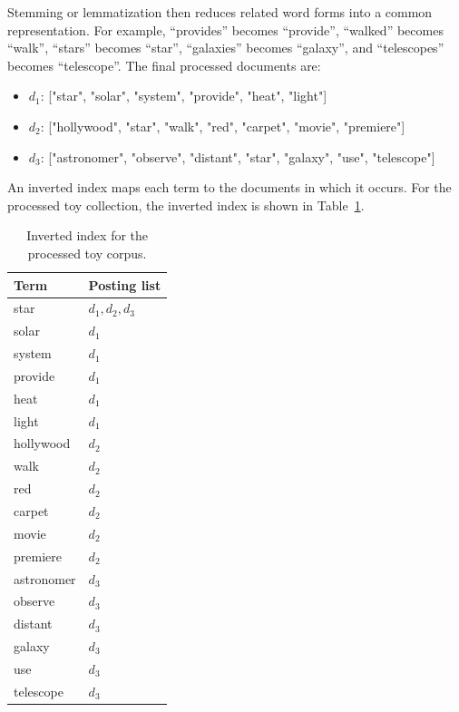Stemming or lemmatization then reduces related word forms into a common
representation. For example, ``provides'' becomes ``provide'', ``walked''
becomes ``walk'', ``stars'' becomes ``star'', ``galaxies'' becomes
``galaxy'', and ``telescopes'' becomes ``telescope''. The final processed
documents are:

\begin{itemize}
    \item $d_1$: ["star", "solar", "system", "provide", "heat", "light"]
    \item $d_2$: ["hollywood", "star", "walk", "red", "carpet", "movie", "premiere"]
    \item $d_3$: ["astronomer", "observe", "distant", "star", "galaxy", "use", "telescope"]
\end{itemize}

An inverted index maps each term to the documents in which it occurs. For the
processed toy collection, the inverted index is shown in
Table~\ref{tab:toy_index}.

\begin{table}[h]
\centering
\caption{Inverted index for the processed toy corpus.}
\label{tab:toy_index}
\begin{tabular}{|l|l|}
\hline
\textbf{Term} & \textbf{Posting list} \\ 
\hline
star & $d_1, d_2, d_3$ \\ 
\hline
solar & $d_1$ \\ 
\hline
system & $d_1$ \\ 
\hline
provide & $d_1$ \\ 
\hline
heat & $d_1$ \\ 
\hline
light & $d_1$ \\ 
\hline
hollywood & $d_2$ \\ 
\hline
walk & $d_2$ \\ 
\hline
red & $d_2$ \\ 
\hline
carpet & $d_2$ \\ 
\hline
movie & $d_2$ \\ 
\hline
premiere & $d_2$ \\ 
\hline
astronomer & $d_3$ \\ 
\hline
observe & $d_3$ \\ 
\hline
distant & $d_3$ \\ 
\hline
galaxy & $d_3$ \\ 
\hline
use & $d_3$ \\ 
\hline
telescope & $d_3$ \\ 
\hline
\end{tabular}
\end{table}

